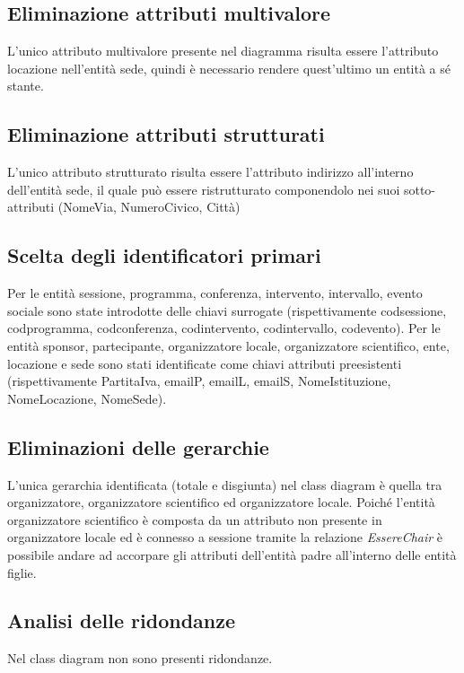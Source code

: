 \documentclass[a4page]{article}
\begin{document}
\subsection{Eliminazione attributi multivalore}
L'unico attributo multivalore presente nel diagramma risulta essere l'attributo locazione nell'entità sede, quindi è necessario rendere quest'ultimo un entità a sé stante. 
\subsection{Eliminazione attributi strutturati}
L'unico attributo strutturato risulta essere l'attributo indirizzo all'interno dell'entità sede, il quale può essere ristrutturato componendolo nei suoi sotto-attributi (NomeVia, NumeroCivico, Città)
\subsection{Scelta degli identificatori primari}
Per le entità sessione, programma, conferenza, intervento, intervallo, evento sociale sono state introdotte delle chiavi surrogate (rispettivamente codsessione, codprogramma, codconferenza, codintervento, codintervallo, codevento). \vspace{1cm}\newline
Per le entità sponsor, partecipante, organizzatore locale, organizzatore scientifico, ente, locazione e sede sono stati identificate come chiavi attributi preesistenti (rispettivamente PartitaIva, emailP, emailL, emailS, NomeIstituzione, NomeLocazione, NomeSede).
\subsection{Eliminazioni delle gerarchie}
L'unica gerarchia identificata (totale e disgiunta) nel class diagram è quella tra organizzatore, organizzatore scientifico ed organizzatore locale. Poiché l'entità organizzatore scientifico è composta da un attributo non presente in organizzatore locale ed è connesso a sessione tramite la relazione \textit{EssereChair} è possibile andare ad accorpare gli attributi dell'entità padre all'interno delle entità figlie.
\subsection{Analisi delle ridondanze}
Nel class diagram non sono presenti ridondanze.
\newpage
\end{document}
